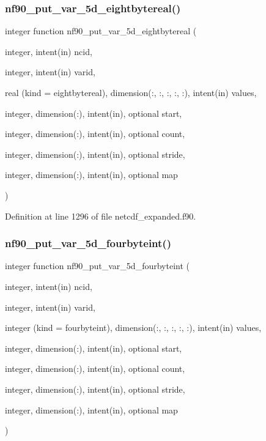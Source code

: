 \subsubsection{\texorpdfstring{nf90\+\_\+put\+\_\+var\+\_\+5d\+\_\+eightbytereal()}{nf90\_put\_var\_5d\_eightbytereal()}}
{\footnotesize\ttfamily integer function nf90\+\_\+put\+\_\+var\+\_\+5d\+\_\+eightbytereal (\begin{DoxyParamCaption}\item[{integer, intent(in)}]{ncid,  }\item[{integer, intent(in)}]{varid,  }\item[{real (kind = eightbytereal), dimension(\+:, \+:, \+:, \+:, \+:), intent(in)}]{values,  }\item[{integer, dimension(\+:), intent(in), optional}]{start,  }\item[{integer, dimension(\+:), intent(in), optional}]{count,  }\item[{integer, dimension(\+:), intent(in), optional}]{stride,  }\item[{integer, dimension(\+:), intent(in), optional}]{map }\end{DoxyParamCaption})}



Definition at line 1296 of file netcdf\+\_\+expanded.\+f90.

\mbox{\label{netcdf__expanded_8f90_a7a19d9c65cae04d84be097e97aac11e4}} 
\subsubsection{\texorpdfstring{nf90\+\_\+put\+\_\+var\+\_\+5d\+\_\+fourbyteint()}{nf90\_put\_var\_5d\_fourbyteint()}}
{\footnotesize\ttfamily integer function nf90\+\_\+put\+\_\+var\+\_\+5d\+\_\+fourbyteint (\begin{DoxyParamCaption}\item[{integer, intent(in)}]{ncid,  }\item[{integer, intent(in)}]{varid,  }\item[{integer (kind = fourbyteint), dimension(\+:, \+:, \+:, \+:, \+:), intent(in)}]{values,  }\item[{integer, dimension(\+:), intent(in), optional}]{start,  }\item[{integer, dimension(\+:), intent(in), optional}]{count,  }\item[{integer, dimension(\+:), intent(in), optional}]{stride,  }\item[{integer, dimension(\+:), intent(in), optional}]{map }\end{DoxyParamCaption})}




